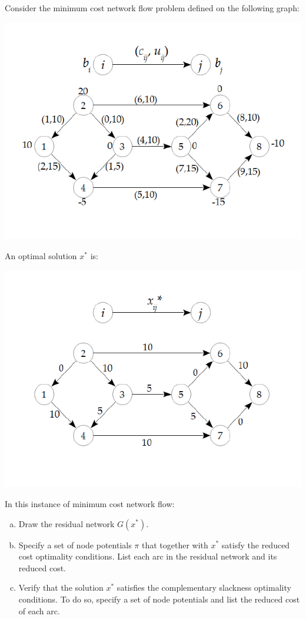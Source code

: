\documentclass[fleqn]{homework}
\begin{document}
  \begin{problem}{4}
    \begin{question}
      Consider the minimum cost network flow problem defined on the following
      graph:

      \includegraphics{problem4-network.pdf}

      An optimal solution $x^*$ is:

      \includegraphics{problem4-flow.pdf}

      In this instance of minimum cost network flow:
      \begin{enumerate}[a.]
        \item Draw the residual network $G(x^*)$.
        \item Specify a set of node potentials $\pi$ that together with $x^*$
          satisfy the reduced cost optimality conditions.  List each arc in the
          residual network and its reduced cost.
        \item Verify that the solution $x^*$ satisfies the complementary
          slackness optimality conditions.  To do so, specify a set of node
          potentials and list the reduced cost of each arc.
      \end{enumerate}
    \end{question}
  \end{problem}
\end{document}
